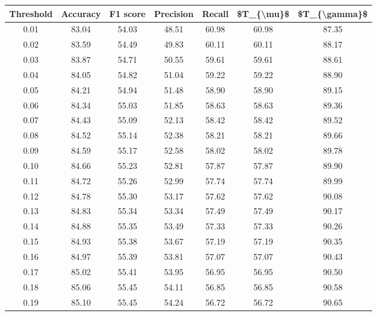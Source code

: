 \begin{tabular}{|c|c|c|c|c|c|c|}
\hline
 Threshold &  Accuracy &  F1 score &  Precision &  Recall &  \$T\_\{\textbackslash mu\}\$ &  \$T\_\{\textbackslash gamma\}\$ \\
\hline
      0.01 &     83.04 &     54.03 &      48.51 &   60.98 &      60.98 &         87.35 \\
      0.02 &     83.59 &     54.49 &      49.83 &   60.11 &      60.11 &         88.17 \\
      0.03 &     83.87 &     54.71 &      50.55 &   59.61 &      59.61 &         88.61 \\
      0.04 &     84.05 &     54.82 &      51.04 &   59.22 &      59.22 &         88.90 \\
      0.05 &     84.21 &     54.94 &      51.48 &   58.90 &      58.90 &         89.15 \\
      0.06 &     84.34 &     55.03 &      51.85 &   58.63 &      58.63 &         89.36 \\
      0.07 &     84.43 &     55.09 &      52.13 &   58.42 &      58.42 &         89.52 \\
      0.08 &     84.52 &     55.14 &      52.38 &   58.21 &      58.21 &         89.66 \\
      0.09 &     84.59 &     55.17 &      52.58 &   58.02 &      58.02 &         89.78 \\
      0.10 &     84.66 &     55.23 &      52.81 &   57.87 &      57.87 &         89.90 \\
      0.11 &     84.72 &     55.26 &      52.99 &   57.74 &      57.74 &         89.99 \\
      0.12 &     84.78 &     55.30 &      53.17 &   57.62 &      57.62 &         90.08 \\
      0.13 &     84.83 &     55.34 &      53.34 &   57.49 &      57.49 &         90.17 \\
      0.14 &     84.88 &     55.35 &      53.49 &   57.33 &      57.33 &         90.26 \\
      0.15 &     84.93 &     55.38 &      53.67 &   57.19 &      57.19 &         90.35 \\
      0.16 &     84.97 &     55.39 &      53.81 &   57.07 &      57.07 &         90.43 \\
      0.17 &     85.02 &     55.41 &      53.95 &   56.95 &      56.95 &         90.50 \\
      0.18 &     85.06 &     55.45 &      54.11 &   56.85 &      56.85 &         90.58 \\
      0.19 &     85.10 &     55.45 &      54.24 &   56.72 &      56.72 &         90.65 \\

\end{tabular}
